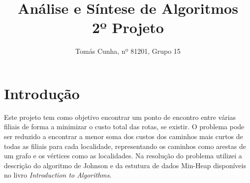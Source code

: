 \documentclass[12pt,a4paper,notitlepage]{article}
\begin{document}
\title{\textbf{Análise e Síntese de Algoritmos} \\\large 2º Projeto}
\date{}
\author{Tomás Cunha, nº 81201, Grupo 15}
\maketitle
\section{Introdução}
Este projeto tem como objetivo encontrar um ponto de encontro entre várias filiais de forma a minimizar o custo total das rotas, se existir.
O problema pode ser reduzido a encontrar a menor soma dos custos dos caminhos mais curtos de todas as filiais para cada localidade, representando os caminhos como arestas de um grafo e os vértices como as localidades.
Na resolução do problema utilizei a descrição do algoritmo de Johnson e da estutura de dados Min-Heap disponíveis no livro \emph{Introduction to Algorithms}\cite{algs3ed}.
\end{document}
